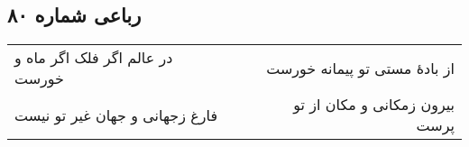 \begin{center}
\section*{رباعی شماره ۸۰}
\label{sec:sh080}
\begin{longtable}{l p{0.5cm} r}
در عالم اگر فلک اگر ماه و خورست
&&
از بادهٔ مستی تو پیمانه خورست
\\
فارغ زجهانی و جهان غیر تو نیست
&&
بیرون زمکانی و مکان از تو پرست
\\
\end{longtable}
\end{center}
